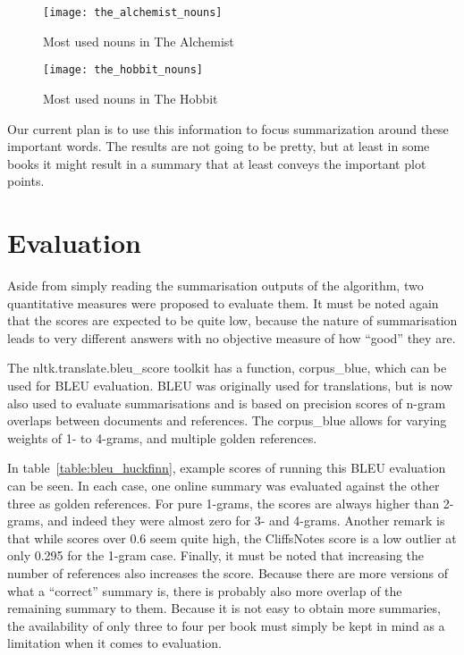 \begin{figure}[h]
	\centering
	\texttt{[image: the\_alchemist\_nouns]}
	\caption{Most used nouns in The Alchemist}\label{fig:the_alchemist_nouns}
\end{figure}

\begin{figure}[h]
	\centering
	\texttt{[image: the\_hobbit\_nouns]}
	\caption{Most used nouns in The Hobbit}\label{fig:the_hobbit_nouns}
\end{figure}

Our current plan is to use this information to focus summarization around these
important words. The results are not going to be pretty, but at least in some
books it might result in a summary that at least conveys the important plot
points.


\section{Evaluation}
Aside from simply reading the summarisation outputs of the algorithm, two
quantitative measures were proposed to evaluate them. It must be noted again
that the scores are expected to be quite low, because the nature of
summarisation leads to very different answers with no objective measure of how
``good'' they are. 

The nltk.translate.bleu\_score toolkit has a function, corpus\_blue, which can
be used for BLEU evaluation. BLEU was originally used for translations, but is
now also used to evaluate summarisations and is based on precision scores of
n-gram overlaps between documents and references. The corpus\_blue allows for
varying weights of 1- to 4-grams, and multiple golden references. 

In table~\ref{table:bleu_huckfinn}, example scores of running this BLEU
evaluation can be seen. In each case, one online summary was evaluated against
the other three as golden references. For pure 1-grams, the scores are always
higher than 2-grams, and indeed they were almost zero for 3- and 4-grams.
Another remark is that while scores over 0.6 seem quite high, the CliffsNotes
score is a low outlier at only 0.295 for the 1-gram case. Finally, it must be
noted that increasing the number of references also increases the score.
Because there are more versions of what a ``correct'' summary is, there is
probably also more overlap of the remaining summary to them. Because it is not
easy to obtain more summaries, the availability of only three to four per book
must simply be kept in mind as a limitation when it comes to evaluation.

